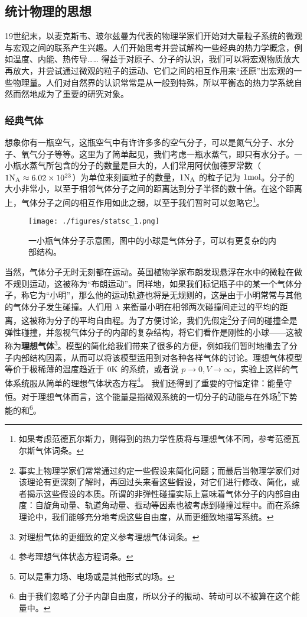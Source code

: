 \subsection{统计物理的思想}
19世纪末，以麦克斯韦、玻尔兹曼为代表的物理学家们开始对大量粒子系统的微观与宏观之间的联系产生兴趣。人们开始思考并尝试解构一些经典的热力学概念，例如温度、内能、热传导…… 得益于对原子、分子的认识，我们可以将宏观物质放大再放大，并尝试通过微观的粒子的运动、它们之间的相互作用来“还原”出宏观的一些物理量。人们对自然界的认识常常是从一般到特殊，所以平衡态的热力学系统自然而然地成为了重要的研究对象。
\subsubsection{经典气体}
想象你有一瓶空气，这瓶空气中有许许多多的空气分子，可以是氮气分子、水分子、氧气分子等等。这里为了简单起见，我们考虑一瓶水蒸气，即只有水分子。一小瓶水蒸气所包含的分子的数量是巨大的，人们常用阿伏伽德罗常数（$1 {\rm N_A}\approx 6.02\times 10^{23}$）为单位来刻画粒子的数量，$1 {\rm N_A}$ 的粒子记为 $1 {\rm mol}$。分子的大小非常小，以至于相邻气体分子之间的距离达到分子半径的数十倍。在这个距离上，气体分子之间的相互作用如此之弱，以至于我们暂时可以忽略它\footnote{如果考虑范德瓦尔斯力，则得到的热力学性质将与理想气体不同，参考范德瓦尔斯气体词条。}。

\begin{figure}[ht]
\centering
\texttt{[image: ./figures/statsc\_1.png]}
\caption{一小瓶气体分子示意图，图中的小球是气体分子，可以有更复杂的内部结构。} \label{statsc_fig1}
\end{figure}
当然，气体分子无时无刻都在运动。英国植物学家布朗发现悬浮在水中的微粒在做不规则运动，这被称为“布朗运动”。同样地，如果我们标记瓶子中的某一个气体分子，称它为“小明”，那么他的运动轨迹也将是无规则的，这是由于小明常常与其他的气体分子发生碰撞。人们用 $\lambda$ 来衡量小明在相邻两次碰撞间走过的平均的距离，这被称为分子的平均自由程。为了方便讨论，我们先假定\footnote{事实上物理学家们常常通过约定一些假设来简化问题；而最后当物理学家们对该理论有更深刻了解时，再回过头来看这些假设，对它们进行修改、简化，或者揭示这些假设的本质。所谓的非弹性碰撞实际上意味着气体分子的内部自由度：自旋角动量、轨道角动量、振动等因素也被考虑到碰撞过程中。而在系综理论中，我们能够充分地考虑这些自由度，从而更细致地描写系统。}分子间的碰撞全是弹性碰撞，并忽视气体分子的内部的复杂结构，将它们看作是刚性的小球——这被称为\textbf{理想气体}\footnote{对理想气体的更细致的定义参考理想气体词条。}。模型的简化给我们带来了很多的方便，例如我们暂时地撇去了分子内部结构因素，从而可以将该模型运用到对各种各样气体的讨论。理想气体模型等价于极稀薄的温度趋近于 $0 \rm K$ 的系统，或者说 $p\rightarrow 0,V\rightarrow \infty$，实验上这样的气体系统服从简单的理想气体状态方程\footnote{参考理想气体状态方程词条。}。
我们还得到了重要的守恒定律：能量守恒。对于理想气体而言，这个能量是指微观系统的一切分子的动能与在外场\footnote{可以是重力场、电场或是其他形式的场。}下势能的和\footnote{由于我们忽略了分子内部自由度，所以分子的振动、转动可以不被算在这个能量中。}。

